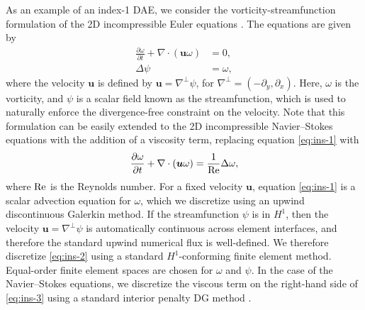 \documentclass[review]{siamart}
\begin{document}
As an example of an index-1 DAE, we consider the vorticity-streamfunction formulation of the 2D incompressible Euler equations \cite{Liu2000}.
The equations are given by
\begin{align}
	\label{eq:ins-1}
	\frac{\partial\omega}{\partial t} + \nabla\cdot(\bm{u} \omega) &= 0, \\
	\label{eq:ins-2}
	\Delta \psi &= \omega,
\end{align}
where the velocity $\bm u$ is defined by $\bm u = \nabla^\perp \psi$, for $\nabla^\perp = (-\partial_y, \partial_x)$.
Here, $\omega$ is the vorticity, and $\psi$ is a scalar field known as the streamfunction, which is used to naturally enforce the divergence-free constraint on the velocity.
Note that this formulation can be easily extended to the 2D incompressible Navier--Stokes equations with the addition of a viscosity term, replacing equation \eqref{eq:ins-1} with
\begin{equation} \label{eq:ins-3}
	\frac{\partial\omega}{\partial t} + \nabla\cdot(\bm{u} \omega) = \frac{1}{\rm Re} \Delta \omega,
\end{equation}
where $\rm Re$ is the Reynolds number.
For a fixed velocity $\bm u$, equation \eqref{eq:ins-1} is a scalar advection equation for $\omega$, which we discretize using an upwind discontinuous Galerkin method.
If the streamfunction $\psi$ is in $H^1$, then the velocity $\bm u = \nabla^\perp \psi$ is automatically continuous across element interfaces, and therefore the standard upwind numerical flux is well-defined.
We therefore discretize \eqref{eq:ins-2} using a standard $H^1$-conforming finite element method.
Equal-order finite element spaces are chosen for $\omega$ and $\psi$.
In the case of the Navier--Stokes equations, we discretize the viscous term on the right-hand side of \eqref{eq:ins-3} using a standard interior penalty DG method \cite{Arnold1982}.
\end{document}
